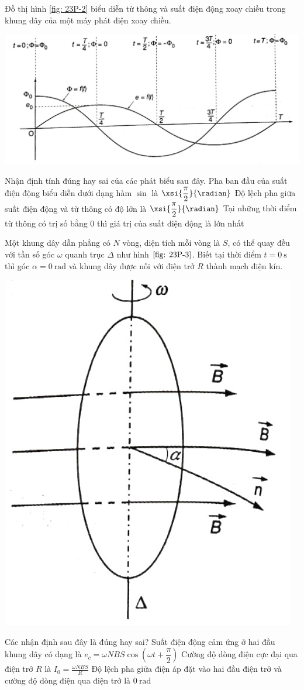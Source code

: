 \begin{ex}
	Đồ thị hình \ref{fig: 23P-2} biểu diễn từ thông và suất điện động xoay chiều trong khung dây của một máy phát điện xoay chiều.
	\begin{center}
		\includegraphics[width=0.65\linewidth]{figs/VN12-Y24-PH-SYL-023P-2}
		\label{fig: 23P-2}
	\end{center}
	Nhận định tính đúng hay sai của các phát biểu sau đây.
	{Pha ban đầu của suất điện động biểu diễn dưới dạng hàm $\sin$ là $\xsi{\dfrac{\pi}{2}}{\radian}$}
	{\True Độ lệch pha giữa suất điện động và từ thông có độ lớn là $\xsi{\dfrac{\pi}{2}}{\radian}$}
	{\True Tại những thời điểm từ thông có trị số bằng 0 thì giá trị của suất điện động là lớn nhất}
	\loigiai{}
\end{ex}
\begin{ex}
	Một khung dây dẫn phẳng có $N$ vòng, diện tích mỗi vòng là $S$, có thể quay đều với tần số góc $\omega$ quanh trục $\Delta$ như hình $\ref{fig: 23P-3}$. Biết tại thời điểm $t=\SI{0}{\second}$ thì góc $\alpha=\SI{0}{\radian}$ và khung dây được nối với điện trở $R$ thành mạch điện kín.
	\begin{center}
		\includegraphics[width=0.3\linewidth]{figs/VN12-Y24-PH-SYL-023P-3}
		\label{fig: 23P-3}
	\end{center}
	Các nhận định sau đây là đúng hay sai?
	{Suất điện động cảm ứng ở hai đầu khung dây có dạng là $e_c=\omega NBS\cos\left(\omega t+\dfrac{\pi}{2}\right)$}
	{\True Cường độ dòng điện cực đại qua điện trở $R$ là $I_0=\frac{\omega NBS}{R}$}
	{\True Độ lệch pha giữa điện áp đặt vào hai đầu điện trở và cường độ dòng điện qua điện trở là $\SI{0}{\radian}$}
	\loigiai{}
\end{ex}
